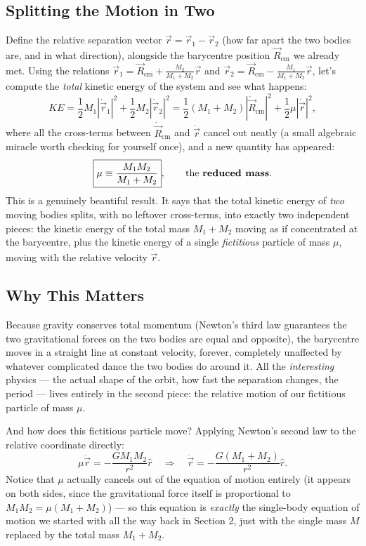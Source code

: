 \documentclass[11pt]{article}
\begin{document}
\subsection*{Splitting the Motion in Two}

Define the relative separation vector $\vec r=\vec r_1-\vec r_2$ (how far apart the two bodies are,
and in what direction), alongside the barycentre position $\vec R_{\text{cm}}$ we already met.
Using the relations $\vec r_1=\vec R_{\text{cm}}+\frac{M_2}{M_1+M_2}\vec r$ and
$\vec r_2=\vec R_{\text{cm}}-\frac{M_1}{M_1+M_2}\vec r$, let's compute the \emph{total} kinetic
energy of the system and see what happens:
\[
KE = \frac12M_1|\dot{\vec r}_1|^2+\frac12M_2|\dot{\vec r}_2|^2
= \frac12(M_1+M_2)|\dot{\vec R}_{\text{cm}}|^2 + \frac12\mu|\dot{\vec r}|^2,
\]
where all the cross-terms between $\dot{\vec R}_{\text{cm}}$ and $\dot{\vec r}$ cancel out neatly
(a small algebraic miracle worth checking for yourself once), and a new quantity has appeared:
\[
\boxed{\mu \equiv \frac{M_1M_2}{M_1+M_2}}, \qquad \text{the \textbf{reduced mass}}.
\]
This is a genuinely beautiful result. It says that the total kinetic energy of \emph{two} moving
bodies splits, with no leftover cross-terms, into exactly two independent pieces: the kinetic
energy of the total mass $M_1+M_2$ moving as if concentrated at the barycentre, plus the kinetic
energy of a single \emph{fictitious} particle of mass $\mu$, moving with the relative velocity
$\dot{\vec r}$.

\subsection*{Why This Matters}

Because gravity conserves total momentum (Newton's third law guarantees the two gravitational
forces on the two bodies are equal and opposite), the barycentre moves in a straight line at
constant velocity, forever, completely unaffected by whatever complicated dance the two bodies do
around it. All the \emph{interesting} physics --- the actual shape of the orbit, how fast the
separation changes, the period --- lives entirely in the second piece: the relative motion of our
fictitious particle of mass $\mu$.

And how does this fictitious particle move? Applying Newton's second law to the relative
coordinate directly:
\[
\mu\ddot{\vec r} = -\frac{GM_1M_2}{r^2}\hat r \quad\Longrightarrow\quad
\ddot{\vec r} = -\frac{G(M_1+M_2)}{r^2}\hat r.
\]
Notice that $\mu$ actually cancels out of the equation of motion entirely (it appears on both
sides, since the gravitational force itself is proportional to $M_1M_2 = \mu(M_1+M_2)$) --- so this
equation is \emph{exactly} the single-body equation of motion we started with all the way back in
Section 2, just with the single mass $M$ replaced by the total mass $M_1+M_2$.
\end{document}
